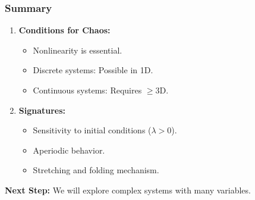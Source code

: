 \documentclass{beamer}
\begin{document}
\begin{frame}
    \frametitle{Summary}
    \begin{enumerate}
        \item \textbf{Conditions for Chaos:}
        \begin{itemize}
            \item Nonlinearity is essential.
            \item Discrete systems: Possible in 1D.
            \item Continuous systems: Requires $\ge 3$D.
        \end{itemize}
        \item \textbf{Signatures:}
        \begin{itemize}
            \item Sensitivity to initial conditions ($\lambda > 0$).
            \item Aperiodic behavior.
            \item Stretching and folding mechanism.
        \end{itemize}
    \end{enumerate}
    
    \vspace{0.5cm}
    \textbf{Next Step:} We will explore complex systems with many variables.
\end{frame}
\end{document}
